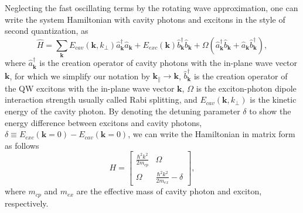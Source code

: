 Neglecting the fast oscillating terms by the rotating wave approximation, one can write the system Hamiltonian with cavity photons and excitons in the style of second quantization, as
%
\begin{equation}
    \hat{H} = \sum_\mathbf{k} E_{cav}\left(\mathbf{k},k_\bot\right)\hat{a}^\dagger_\mathbf{k}\hat{a}_\mathbf{k}+E_{exc}\left(\mathbf{k}\right)\hat{b}_\mathbf{k}^\dagger\hat{b}_\mathbf{k}+\Omega\left( \hat{a}^\dagger_\mathbf{k}\hat{b}_\mathbf{k} + \hat{a}_\mathbf{k}\hat{b}^\dagger_\mathbf{k}\right),
    \label{eq:CH1_pl_ham}
\end{equation}
where $\hat{a}^\dagger_\mathbf{k}$ is the creation operator of cavity photons with the in-plane wave vector $\mathbf{k}$, for which we simplify our notation by $\mathbf{k}_\parallel \to \mathbf{k}$,
$\hat{b}_\mathbf{k}^\dagger$ is the creation operator of the QW excitons with the in-plane wave vector $\mathbf{k}$,
$\Omega$ is the exciton-photon dipole interaction strength usually called Rabi splitting,
and $E_{cav}\left(\mathbf{k},k_\bot\right)$ is the kinetic energy of the cavity photon.
By denoting the detuning parameter $\delta$ to show the energy difference between excitons and cavity photons, $\delta \equiv E_{exc}\left(\mathbf{k}=0\right) - E_{cav}\left( \mathbf{k}=0\right)$, we can write the Hamiltonian in matrix form as follows
\begin{equation}
    H =
    \begin{bmatrix}
        \frac{\hbar^2 k^2}{2m_{cp}} & \Omega \\
        \Omega &  \frac{\hbar^2 k^2}{2m_{ex}} - \delta
    \end{bmatrix}
    \label{eq:Ch1_pl_matrix},
\end{equation}
where $m_{cp}$ and $m_{ex}$ are the effective mass of cavity photon and exciton, respectively.

